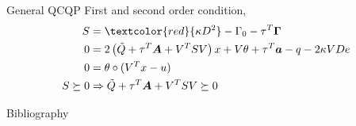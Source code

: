 \documentclass{beamerswitch}
\newcommand{\red}[1]{\textcolor{red}{#1}}
\begin{document}
\begin{frame}[allowframebreaks]{General QCQP}
  First and second order condition,
  \begin{align*}
    S           & = \red{\kappa D^2} - \Gamma_0 - \tau^T \bm  \Gamma                                          \\
    0           & = 2\left(\tilde Q + \tau^T \bm A + V^TSV\right) x + V\theta + \tau^T\bm a - q - 2\kappa VDe \\
    0           & = \theta \circ (V^Tx-u)                                                                     \\
    S \succeq 0 & \Rightarrow \tilde Q + \tau^T \bm A + V^TSV \succeq 0
  \end{align*}
\end{frame}

\begin{frame}[allowframebreaks]{Bibliography}
  
  
\end{frame}
\end{document}
